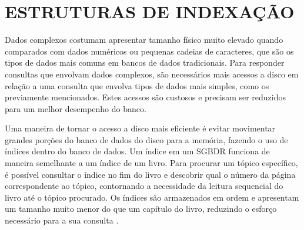 

\section{ESTRUTURAS DE INDEXAÇÃO}
\label{sec:index}

Dados complexos costumam apresentar tamanho físico muito elevado quando comparados com dados numéricos ou pequenas cadeias de caracteres, que são os tipos de dados
mais comuns em bancos de dados tradicionais. Para responder consultas que envolvam dados complexos, são necessários mais acessos a disco em relação a uma consulta
que envolva tipos de dados mais simples, como os previamente mencionados. Estes acessos são custosos e precisam ser reduzidos para um melhor desempenho do banco.\par 

Uma maneira de tornar o acesso a disco mais eficiente é evitar movimentar grandes porções do banco de dados do disco para a memória, fazendo o uso de índices dentro do banco de dados. 
Um índice em um SGBDR funciona de maneira semelhante a um índice de um livro. Para procurar um tópico específico, é possível consultar o índice no fim do livro e descobrir qual o número da página
correspondente ao tópico, contornando a necessidade da leitura sequencial do livro até o tópico procurado. Os índices são armazenados em ordem e apresentam um tamanho
muito menor do que um capítulo do livro, reduzindo o esforço necessário para a sua consulta \cite{Silberschatz2011}.\par

